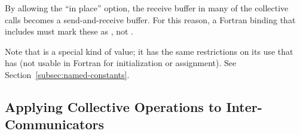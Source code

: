 \begin{users}
By allowing the ``in place'' option, the receive buffer in many of the
collective calls becomes a send-and-receive buffer.  For this reason, a
Fortran binding that includes  must mark these as ,
not .

Note that  is a special kind of value; it has the
same
restrictions on its use that  has
(not usable in Fortran for initialization or assignment).
See Section~\ref{subsec:named-constants}.
\end{users}

\subsection{Applying Collective Operations to Inter-Communicators}
\label{sec:collective-2}
\label{sec:MPI-coll}

